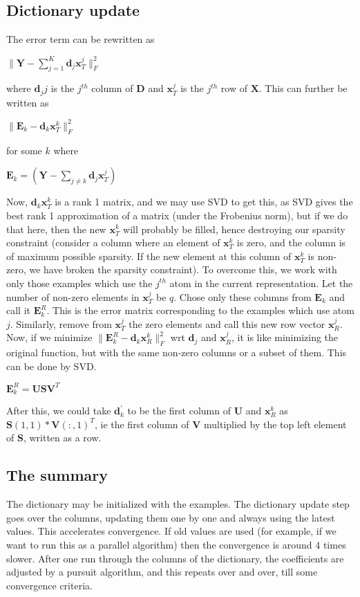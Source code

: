 \documentclass[10pt,a4paper,final]{article}
\begin{document}
\subsection{Dictionary update}
The error term can be rewritten as
\begin{center}
$\|\mathbf{Y}-\sum_{j=1}^{K}\mathbf{d}_j\mathbf{x}_T^j\|_F^2$
\end{center}
where $\mathbf{d}_jj$ is the $j^{th}$ column of $\mathbf{D}$ and $\mathbf{x}_T^j$ is the $j^{th}$ row of $\mathbf{X}$. This can further be written as 
\begin{center}
$\|\mathbf{E}_k - \mathbf{d}_k\mathbf{x}_T^k\|_F^2$
\end{center}
for some $k$ where 
\begin{center}
$\mathbf{E}_k=\left(\mathbf{Y}-\sum_{j \neq k} \mathbf{d}_j \mathbf{x}_T^j\right)$
\end{center}
Now, $\mathbf{d}_k\mathbf{x}_T^k$ is a rank 1 matrix, and we may use SVD to get this, as SVD gives the best rank 1 approximation of a matrix (under the Frobenius norm), but if we do that here, then the new $\mathbf{x}_T^k$ will probably be filled, hence destroying our sparsity constraint (consider a column where an element of $\mathbf{x}_T^k$ is zero, and the column is of maximum possible sparsity. If the new element at this column of $\mathbf{x}_T^k$ is non-zero, we have broken the sparsity constraint). 
To overcome this, we work with only those examples which use the $j^{th}$ atom in the current representation. Let the number of non-zero elements in $\mathbf{x}_T^j$ be $q$. Chose only these columns from $\mathbf{E}_k$ and call it $\mathbf{E}_k^R$. This is the error matrix corresponding to the examples which use atom $j$. Similarly, remove from $\mathbf{x}_T^j$ the zero elements and call this new row vector $\mathbf{x}_R^j$. 
Now, if we minimize $\|\mathbf{E}_k^R - \mathbf{d}_k\mathbf{x}_R^k\|_F^2$ wrt $\mathbf{d}_j$ and $\mathbf{x}_R^j$, it is like minimizing the original function, but with the same non-zero columns or a subset of them. This can be done by SVD.
\begin{center}
$\mathbf{E}_k^R=\mathbf{USV}^T$
\end{center}
After this, we could take $\mathbf{d}_k^\prime$ to be the first column of $\mathbf{U}$ and $\mathbf{x}_R^k$ as $\mathbf{S}(1,1)*\mathbf{V}(:,1)^T$, ie the first column of $\mathbf{V}$ multiplied by the top left element of $\mathbf{S}$, written as a row.
\subsection{The summary}
The dictionary may be initialized with the examples. The dictionary update step goes over the columns, updating them one by one and always using the latest values. This accelerates convergence. If old values are used (for example, if we want to run this as a parallel algorithm) then the convergence is around 4 times slower. After one run through the columns of the dictionary, the coefficients are adjusted by a pursuit algorithm, and this repeats over and over, till some convergence criteria.
\end{document}
